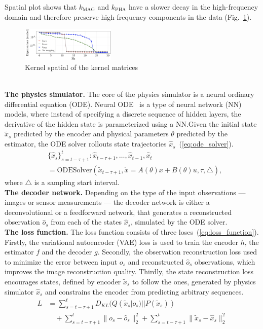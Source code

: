 \documentclass[acmtog]{techreportacmart}
\begin{document}
Spatial plot shows that $k_{\text{MAG}}$ and $k_{\text{PHA}}$ have a slower decay in the high-frequency domain and therefore preserve high-frequency components in the data (Fig.~\ref{fig:eigenvalues}).
\begin{figure}
  \centering
  \includegraphics[width=0.4\textwidth]{eigenvalues}
  \caption{Kernel spatial of the kernel matrices}
  \label{fig:eigenvalues}
\end{figure}
\\
\textbf{The physics simulator.} The core of the physics simulator is a neural ordinary differential equation (ODE). Neural ODE~\cite{NEURIPS2018_69386f6b} is a type of neural network (NN) models, where instead of specifying a discrete sequence of hidden layers, the derivative of the hidden state is parameterized using a NN.\@ Given the initial state ${\tilde{x}_{s}}$ predicted by the encoder and physical parameters ${\theta}$ predicted by the estimator, the ODE solver rollouts state trajectories ${\hat{x}_s}$~(\ref{eq:ode_solver}).
\begin{align}
  \label{eq:ode_solver}
  & \{ \hat{x}_s \}_{s=t-\tau+1}^{t} : \hat{x}_{t-\tau+1}, \ldots, \hat{x}_{t-1}, \hat{x}_t \nonumber \\
  & = \text{ODESolver}( \tilde{x}_{t-\tau+1}, \dot{x} = A({\theta}) x + B({\theta}) u, \tau, \triangle ),
\end{align}
where ${\triangle}$ is a sampling start interval.
\\
\textbf{The decoder network.} Depending on the type of the input observations — images or sensor measurements — the decoder network is either a deconvolutional or a feedforward network, that generates a reconstructed observation ${\hat{o}_s}$ from each of the states ${\hat{x}_s}$, simulated by the ODE solver.
\\
\textbf{The loss function.} The loss function consists of three loses~(\ref{eq:loss_function}). Firstly, the variational autoencoder (VAE) loss is used to train the encoder ${h}$, the estimator ${f}$ and the decoder ${g}$. Secondly, the observation reconstruction loss used to minimize the error between input ${o_s}$ and reconstructed ${\hat{o}_s}$ observations, which improves the image reconstruction quality. Thirdly, the state reconstruction loss encourages states, defined by encoder ${\tilde{x}_{s}}$ to follow the ones, generated by physics simulator ${\hat{x}_s}$ and constrains the encoder from predicting arbitrary sequences.
\begin{equation}
  \label{eq:loss_function}
  \begin{aligned}
  L &= \sum_{s=t-\tau+1}^{t} D_{KL}(Q(\tilde{x}_s|o_s) || P(\tilde{x}_s)) \\
  &\quad + \sum_{s=t-\tau+1}^{t} \| o_s - \hat{o}_s \|_2^2 + \sum_{s=t-\tau+1}^{t} \| \tilde{x}_s - \hat{x}_s \|_2^2
  \end{aligned}
\end{equation}
\end{document}
